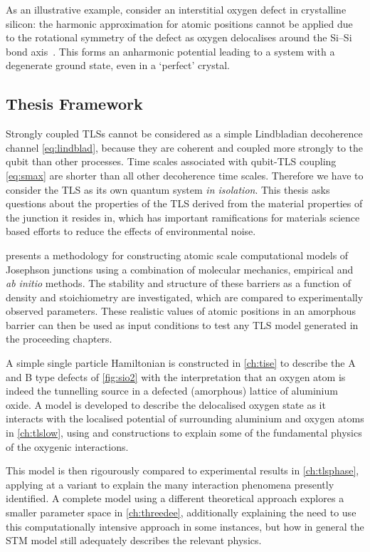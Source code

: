 As an illustrative example, consider an interstitial oxygen defect in crystalline silicon: the harmonic approximation for atomic positions cannot be applied due to the rotational symmetry of the defect as oxygen delocalises around the Si--Si bond axis~\cite{Artacho1995}.
This forms an anharmonic potential leading to a system with a degenerate ground state, even in a `perfect' crystal.

\subsection{Thesis Framework}

Strongly coupled TLSs cannot be considered as a simple Lindbladian decoherence channel \cref{eq:lindblad}, because they are coherent and coupled more strongly to the qubit than other processes.
Time scales associated with qubit-TLS coupling \cref{eq:smax} are shorter than all other decoherence time scales.
Therefore we have to consider the TLS as its own quantum system \textit{in isolation}.
This thesis asks questions about the properties of the TLS derived from the material properties of the junction it resides in, which has important ramifications for materials science based efforts to reduce the effects of environmental noise.

 presents a methodology for constructing atomic scale computational models of Josephson junctions using a combination of molecular mechanics, empirical and \textit{ab initio} methods.
The stability and structure of these barriers as a function of density and stoichiometry are investigated, which are compared to experimentally observed parameters.
These realistic values of atomic positions in an amorphous barrier can then be used as input conditions to test any TLS model generated in the proceeding chapters.

A simple single particle Hamiltonian is constructed in \cref{ch:tise} to describe the A and B type defects of \cref{fig:sio2} with the interpretation that an oxygen atom is indeed the tunnelling source in a defected (amorphous) lattice of aluminium oxide.
A model is developed to describe the delocalised oxygen state as it interacts with the localised potential of surrounding aluminium and oxygen atoms in \cref{ch:tlslow}, using  and  constructions to explain some of the fundamental physics of the oxygenic interactions.

This model is then rigourously compared to experimental results in \cref{ch:tlsphase}, applying at a  variant to explain the many interaction phenomena presently identified.
A complete  model using a different theoretical approach explores a smaller parameter space in \cref{ch:threedee}, additionally explaining the need to use this computationally intensive approach in some instances, but how in general the  STM model still adequately describes the relevant physics.

